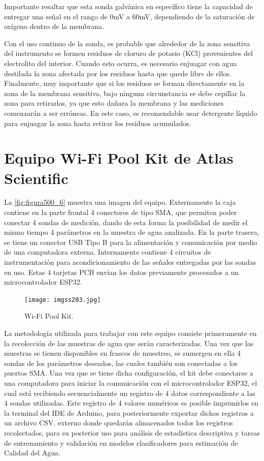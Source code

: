 Importante resaltar que esta sonda galvánica en específico tiene la capacidad de entregar una señal en el rango de 0mV a 60mV, dependiendo de la saturación de oxígeno dentro de la membrana.

Con el uso continuo de la sonda, es probable que alrededor de la zona sensitiva del instrumento se formen residuos de cloruro de potasio (KCl) provenientes del electrolito del interior. Cuando esto ocurra, es necesario enjuagar 
con agua destilada la zona afectada por los residuos hasta que quede libre de ellos. Finalmente, muy importante que si los residuos se forman directamente en la zona de la membrana sensitiva, bajo ninguna circunstancia se debe 
cepillar la zona para retirarlos, ya que esto dañara la membrana y las mediciones comenzarán a ser erróneas. En este caso, es recomendable usar detergente líquido para enjuagar la zona hasta retirar los residuos acumulados.

\clearpage

\section{Equipo Wi-Fi Pool Kit de Atlas Scientific}

La \autoref{fig:figura500_6} muestra una imagen del equipo. Externamente la caja contiene en la parte frontal 4 conectores de tipo SMA, que permiten poder conectar 4 sondas de medición, dando de esta forma la posibilidad de medir el mismo tiempo 4 parámetros en la muestra de agua 
analizada. En la parte trasera, se tiene un conector USB Tipo B para la alimentación y comunicación por medio de una computadora externa. Internamente contiene 4 circuitos de instrumentación para acondicionamiento de las señales entregadas por las sondas en uso. Estas 4 tarjetas PCB envían los datos previamente procesados a un microcontrolador ESP32.

\begin{figure}[h]
	\centering
	\texttt{[image: imgss203.jpg]}
	\caption{Wi-Fi Pool Kit.}
	\label{fig:figura500_6}
\end{figure}

La metodología utilizada para trabajar con este equipo consiste primeramente en la recolección de las muestras de agua que serán caracterizadas. Una vez que las muestras se tienen disponibles en frascos de muestreo, se sumergen 
en ella 4 sondas de los parámetros deseados, las cuales también son conectadas a los puertos SMA. Una vez que se tiene dicha configuración, el kit debe conectarse a una computadora para iniciar la comunicación con el 
microcontrolador ESP32, el cual está recibiendo secuencialmente un registro de 4 datos correspondiente a las 4 sondas utilizadas. Este registro de 4 valores numéricos es posible imprimirlos en la terminal del IDE de Arduino,
para posteriormente exportar dichos registros a un archivo CSV. externo donde quedarán almacenados todos los registros recolectados, para su posterior uso para análisis de estadística descriptiva y tareas de entrenamiento y 
validación en modelos clasificadores para estimación de Calidad del Agua.

